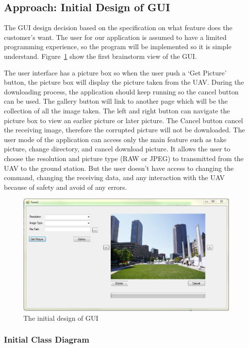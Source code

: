 \documentclass[oneside]{ecsgdp}         %
\begin{document}
\subsection{Approach: Initial Design of GUI}
The GUI design decision based on the specification on what feature does the customer’s want. The user for our application is assumed to have a limited programming experience, so the program will be implemented so it is simple understand. Figure~\ref{ini_GUI} show the first brainstorm view of the GUI. 

The user interface has a picture box so when the user push a ‘Get Picture’ button, the picture box will display the picture taken from the UAV. During the downloading process, the application should keep running so the cancel button can be used. The gallery button will link to another page which will be the collection of all the image taken. The left and right button can navigate the picture box to view an earlier picture or later picture. The Cancel button cancel the receiving image, therefore the corrupted picture will not be downloaded. The user mode of the application can access only the main feature such as take picture, change directory, and cancel download picture.  It allows the user to choose the resolution and picture type (RAW or JPEG) to transmitted from the UAV to the ground station. But the user doesn't have access to changing the command, changing the receiving data, and any interaction with the UAV because of safety and avoid of any errors. 

\begin{figure}[!hbtp]
\includegraphics[scale=0.7]{initialGUI.png} 
\caption{The initial design of GUI\label{ini_GUI}}
\end{figure}

\subsubsection{Initial Class Diagram}
\end{document}
